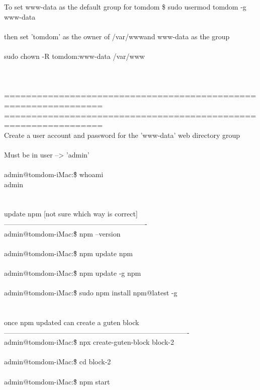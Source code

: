 \documentclass[10pt,a4paper]{article}
\begin{document}
{{{{{{{{{{{{{{{{{{To set www-data as the default group for tomdom  \$ sudo usermod tomdom -g www-data}{\large \\
\\
then set 'tomdom' as the owner of /var/www}{\large  and www-data as the group\\
\\
sudo chown -R tomdom:www-data /var/www}{\large \\
\\
\\
\\
================================================================\\
================================================================\\
Create a user account and password for the 'www-data' web directory group\\
\\
Must be in user --> 'admin'\\
\\
admin@tomdom-iMac:\~\$ whoami\\
admin\\
\\
\\
update npm [not sure which way is correct]\\
-------------------------------------------------------------\\
admin@tomdom-iMac:\~\$ npm --version\\
\\
admin@tomdom-iMac:\~\$ npm update npm\\
\\
admin@tomdom-iMac:\~\$ npm update -g npm\\
\\
admin@tomdom-iMac:\~\$ sudo npm install npm@latest -g\\
\\
\\
once npm updated can create a guten block\\
-------------------------------------------------------------------------------\\
admin@tomdom-iMac:\~\$ npx create-guten-block block-2\\
\\
admin@tomdom-iMac:\~\$ cd block-2\\
\\
admin@tomdom-iMac:\~\$ npm start\\
\\
\\
}}}}}}}}}}}}}}}}}}
\end{document}

